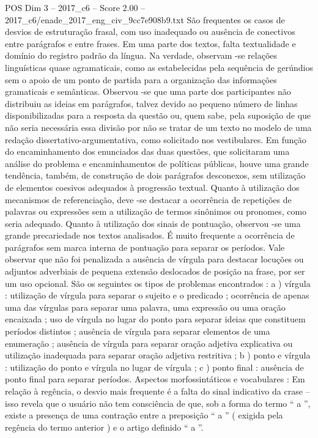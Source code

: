\begin{textsample}{POS Dim 3 – 2017\_c6 – Score 2.00 – 2017\_c6/enade\_2017\_eng\_civ\_9cc7e908b9.txt}
São frequentes os casos de desvios de estruturação frasal, com uso inadequado ou ausência de conectivos entre parágrafos e entre frases.
Em uma parte dos textos, falta textualidade e domínio do registro padrão da língua.
Na verdade, observam -se relações linguísticas quase agramaticais, como as estabelecidas pela sequência de gerúndios sem o apoio de um ponto de partida para a organização das informações gramaticais e semânticas.
Observou -se que uma parte dos participantes não distribuiu as ideias em parágrafos, talvez devido ao pequeno número de linhas disponibilizadas para a resposta da questão ou, quem sabe, pela suposição de que não seria necessária essa divisão por não se tratar de um texto no modelo de uma redação dissertativo-argumentativa, como solicitado nos vestibulares.
Em função do encaminhamento dos enunciados das duas questões, que solicitaram uma análise do problema e encaminhamentos de políticas públicas, houve uma grande tendência, também, de construção de dois parágrafos desconexos, sem utilização de elementos coesivos adequados à progressão textual.
Quanto à utilização dos mecanismos de referenciação, deve -se destacar a ocorrência de repetições de palavras ou expressões sem a utilização de termos sinônimos ou pronomes, como seria adequado.
Quanto à utilização dos sinais de pontuação, observou -se uma grande precariedade nos textos analisados.
É muito frequente a ocorrência de parágrafos sem marca interna de pontuação para separar os períodos.
Vale observar que não foi penalizada a ausência de vírgula para destacar locuções ou adjuntos adverbiais de pequena extensão deslocados de posição na frase, por ser um uso opcional.
São os seguintes os tipos de problemas encontrados : a ) vírgula : utilização de vírgula para separar o sujeito e o predicado ; ocorrência de apenas uma das vírgulas para separar uma palavra, uma expressão ou uma oração encaixada ; uso de vírgula no lugar do ponto para separar ideias que constituem períodos distintos ; ausência de vírgula para separar elementos de uma enumeração ; ausência de vírgula para separar oração adjetiva explicativa ou utilização inadequada para separar oração adjetiva restritiva ; b ) ponto e vírgula : utilização do ponto e vírgula no lugar de vírgula ; c ) ponto final : ausência de ponto final para separar períodos.
Aspectos morfossintáticos e vocabulares : Em relação à regência, o desvio mais frequente é a falta do sinal indicativo da crase – isso revela que o usuário não tem consciência de que, sob a forma do termo “ a ”, existe a presença de uma contração entre a preposição “ a ” ( exigida pela regência do termo anterior ) e o artigo definido “ a ”.

\end{textsample}
